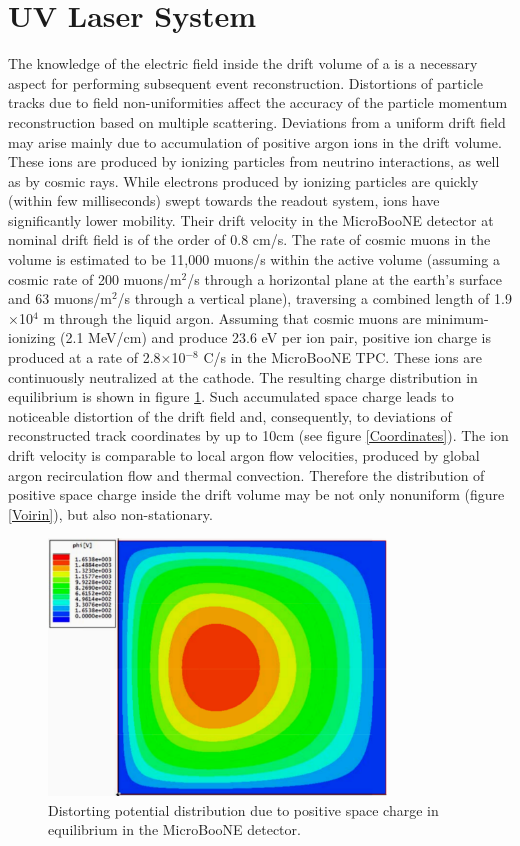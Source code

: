 \section{UV Laser System}
\label{sec:laser}

The knowledge of the electric field inside the drift volume of a \lartpc is a necessary aspect for performing subsequent event reconstruction. Distortions of particle tracks due to field non-uniformities affect the accuracy of the particle momentum reconstruction based on multiple scattering.  Deviations from a uniform drift field may arise mainly due to accumulation of positive argon ions in the drift volume. These ions are produced by ionizing particles from neutrino interactions, as well as by cosmic rays. While electrons produced by ionizing particles are quickly (within few milliseconds) swept towards the readout system, ions have significantly lower mobility. Their drift velocity in the MicroBooNE detector at nominal drift field is of the order of 0.8 cm/s. The rate of cosmic muons in the \lartpc volume is estimated to be 11,000 muons/s within the active volume (assuming a cosmic rate of 200 muons/m$^2$/s through a horizontal plane at the earth's surface and 63 muons/m$^2$/s through a vertical plane), traversing a combined length of 1.9$\times$10$^4$ m through the liquid argon.  Assuming that cosmic muons are minimum-ionizing (2.1 MeV/cm) and produce 23.6 eV per ion pair, positive ion charge is produced at a rate of 2.8$\times$10$^{-8}$ C/s in the MicroBooNE TPC. These ions are continuously neutralized at the cathode. The resulting charge distribution in equilibrium is shown in figure \ref{Ions}. Such accumulated space charge leads to noticeable distortion of the drift field and, consequently, to deviations of reconstructed track coordinates by up to 10cm (see figure \ref{Coordinates}).  The ion drift velocity is comparable to local argon flow velocities, produced by global argon recirculation flow and thermal convection. Therefore the distribution of positive space charge inside the drift volume may be not only nonuniform (figure \ref{Voirin}), but also non-stationary.

\begin{figure}[htb]
\centering	
\includegraphics[width=0.8\textwidth]{figures/Potential.pdf}
\caption{Distorting potential distribution due to positive space charge in equilibrium in the MicroBooNE detector.}
\label{Ions}
\end{figure}

